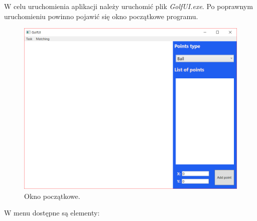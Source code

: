 \documentclass[10pt,a4paper]{article}
\begin{document}
	W celu uruchomienia aplikacji należy uruchomić plik \textit{GolfUI.exe}. Po poprawnym uruchomieniu powinno pojawić się okno początkowe programu. 
	
	\begin{figure}[H]
		\centering	
 			\includegraphics[scale=0.6]{images/initial.png}
 			\caption{Okno początkowe.}
 		\label{fig:algorithm_diagram}
	\end{figure}	
	
	W menu dostępne są elementy:
	
\end{document}
